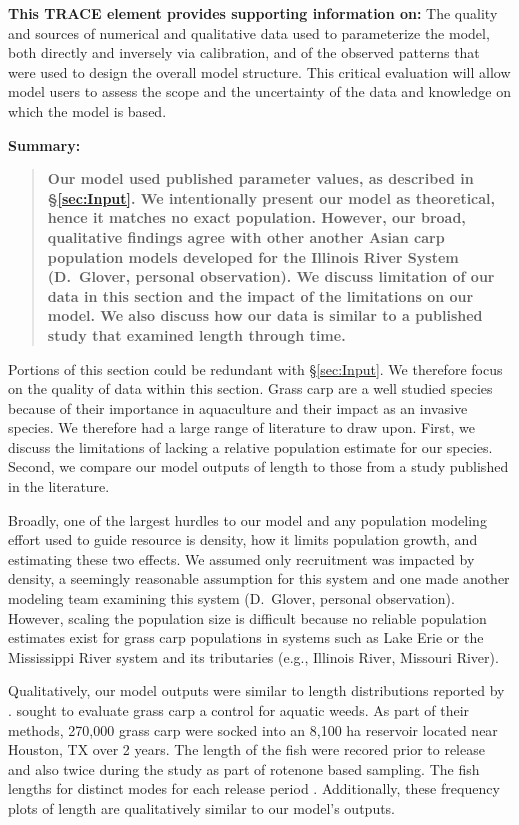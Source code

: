 \documentclass{article}[12pt]
\begin{document}
\textbf{This TRACE element provides supporting information on:} The quality and sources of numerical and qualitative data used to parameterize the model, both directly and inversely via calibration, and of the observed patterns that were used to design the overall model structure. This critical evaluation will allow model users to assess the scope and the uncertainty of the data and knowledge on which the model is based.

\textbf{Summary:}
\begin{verse}
\textbf{
Our model used published parameter values, as described in \S \ref{sec:Input}.
We intentionally present our model as theoretical, hence it matches no exact population.
However, our broad, qualitative findings agree with other another Asian carp population models developed for the Illinois River System (D.~Glover, personal observation).
We discuss limitation of our data in this section and the impact of the limitations on our model.
We also discuss how our data is similar to a published study that examined length through time.
}
\end{verse}

Portions of this section could be redundant with \S \ref{sec:Input}.
We therefore focus on the quality of data within this section.
Grass carp are a well studied species because of their importance in aquaculture and their impact as an invasive species.
We therefore had a large range of literature to draw upon.
First, we discuss the limitations of lacking a relative population estimate for our species.
Second, we compare our model outputs of length to those from a study published in the literature.

Broadly, one of the largest hurdles to our model and any population modeling effort used to guide resource is density, how it limits population growth, and estimating these two effects.
We assumed only recruitment was impacted by density, a seemingly reasonable assumption for this system and one made another modeling team examining this system (D.~Glover, personal observation).
However, scaling the population size is difficult because no reliable population estimates exist for grass carp populations in systems such as Lake Erie or the Mississippi River system and its tributaries (e.g., Illinois River, Missouri River).  

Qualitatively, our model outputs were similar to length distributions reported by \citet{martyn1986mapping}.
\citet{martyn1986mapping} sought to evaluate grass carp a control for aquatic weeds.
As part of their methods, 270,000 grass carp were socked into an 8,100 ha reservoir located near Houston, TX over 2 years. 
The length of the fish were recored prior to release and also twice during the study as part of rotenone based sampling.
The fish lengths for distinct modes for each release period \citep[Figure 11 in][]{martyn1986mapping}.
Additionally, these frequency plots of length are qualitatively similar to our model's outputs. 
\end{document}
